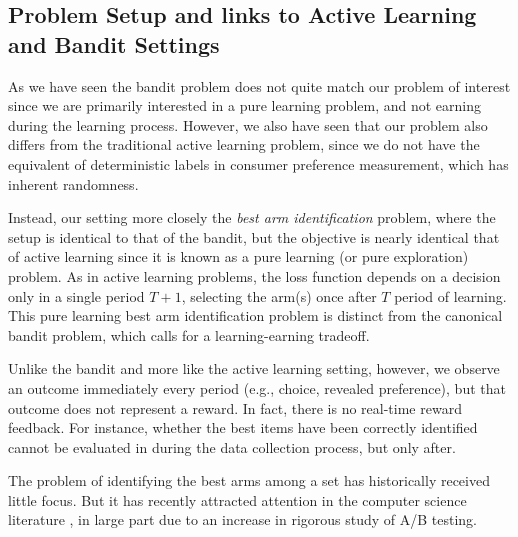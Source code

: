 \documentclass[nonblindrev]{informs3}
\begin{document}
\subsection{Problem Setup and links to Active Learning and Bandit Settings}

As we have seen the bandit problem does not quite match our problem of interest since we are primarily interested in a pure learning problem, and not earning during the learning process. However, we also have seen that our problem also differs from the traditional active learning problem, since we do not have the equivalent of deterministic labels in consumer preference measurement, which has inherent randomness. 

Instead, our setting more closely the \emph{best arm identification} problem, where the setup is identical to that of the bandit, but the objective is nearly identical that of active learning since it is known as a pure learning (or pure exploration) problem. As in active learning problems, the loss function depends on a decision only in a single period $T+1$, selecting the arm(s) once after $T$ period of learning. This pure learning best arm identification problem is distinct from the canonical bandit problem, which calls for a learning-earning tradeoff. 

Unlike the bandit and more like the active learning setting, however, we observe an outcome immediately every period (e.g., choice, revealed preference), but that outcome does not represent a reward. In fact, there is no real-time reward feedback. For instance, whether the best items have been correctly identified cannot be evaluated in during the data collection process, but only after.

The problem of identifying the best arms among a set has historically received little focus. But it has recently attracted attention in the computer science literature \citep{gabillon2012best,jamieson2014lil,kalyanakrishnan2012pac,kaufmann2016complexity,kaufmann2013information,russo2018simple}, in large part due to an increase in rigorous study of A/B testing. 

\end{document}
